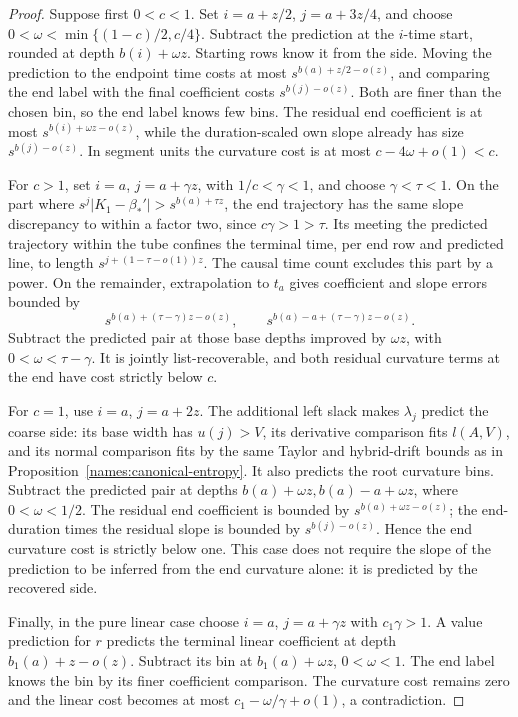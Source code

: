 \begin{proof}
Suppose first \(0<c<1\). Set
\(i=a+z/2\), \(j=a+3z/4\), and choose
\(0<\omega<\min\{(1-c)/2,c/4\}\). Subtract the prediction
at the \(i\)-time start, rounded at depth \(b(i)+\omega z\).
Starting rows know it from the side. Moving the prediction to
the endpoint time costs at most
\(s^{b(a)+z/2-o(z)}\), and comparing the end label with the
final coefficient costs \(s^{b(j)-o(z)}\). Both are finer
than the chosen bin, so the end label knows few bins.
The residual end coefficient is at most
\(s^{b(i)+\omega z-o(z)}\), while the duration-scaled own
slope already has size \(s^{b(j)-o(z)}\). In segment units
the curvature cost is at most \(c-4\omega+o(1)<c\).

For \(c>1\), set \(i=a\), \(j=a+\gamma z\), with
\(1/c<\gamma<1\), and choose \(\gamma<\tau<1\).
On the part where
\(s^j|K_1-\beta_*'|>s^{b(a)+\tau z}\), the end trajectory
has the same slope discrepancy to within a factor two, since
\(c\gamma>1>\tau\). Its meeting the predicted trajectory
within the tube confines the terminal time, per end row and
predicted line, to length
\(s^{j+(1-\tau-o(1))z}\). The causal time count excludes
this part by a power. On the remainder, extrapolation to
\(t_a\) gives coefficient and slope errors bounded by
\[
 s^{b(a)+(\tau-\gamma)z-o(z)},\qquad
 s^{b(a)-a+(\tau-\gamma)z-o(z)}.
\]
Subtract the predicted pair at those base depths improved by
\(\omega z\), with \(0<\omega<\tau-\gamma\).
It is jointly list-recoverable, and both residual curvature
terms at the end have cost strictly below \(c\).

For \(c=1\), use \(i=a\), \(j=a+2z\). The additional
left slack makes \(\lambda_j\) predict the coarse side: its
base width has \(u(j)>V\), its derivative comparison fits
\(l(A,V)\), and its normal comparison fits by the same
Taylor and hybrid-drift bounds as in
Proposition~\ref{names:canonical-entropy}. It also predicts
the root curvature bins. Subtract the predicted pair at
depths \(b(a)+\omega z,b(a)-a+\omega z\), where
\(0<\omega<1/2\). The residual end coefficient is bounded
by \(s^{b(a)+\omega z-o(z)}\); the end-duration times the
residual slope is bounded by \(s^{b(j)-o(z)}\). Hence the
end curvature cost is strictly below one. This case does not
require the slope of the prediction to be inferred from the
end curvature alone: it is predicted by the recovered side.

Finally, in the pure linear case choose \(i=a\),
\(j=a+\gamma z\) with \(c_1\gamma>1\). A value prediction
for \(r\) predicts the terminal linear coefficient at depth
\(b_1(a)+z-o(z)\). Subtract its bin at
\(b_1(a)+\omega z\), \(0<\omega<1\). The end label knows
the bin by its finer coefficient comparison. The curvature
cost remains zero and the linear cost becomes at most
\(c_1-\omega/\gamma+o(1)\), a contradiction.


\end{proof}
